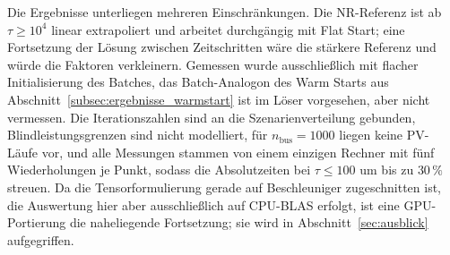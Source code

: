 Die Ergebnisse unterliegen mehreren Einschränkungen. Die NR-Referenz ist ab
$\tau\ge10^4$ linear extrapoliert und arbeitet durchgängig mit Flat Start; eine
Fortsetzung der Lösung zwischen Zeitschritten wäre die stärkere Referenz und
würde die Faktoren verkleinern. Gemessen wurde ausschließlich mit flacher
Initialisierung des Batches, das Batch-Analogon des Warm Starts aus
Abschnitt~\ref{subsec:ergebnisse_warmstart} ist im Löser vorgesehen, aber nicht
vermessen. Die Iterationszahlen sind an die Szenarienverteilung gebunden,
Blindleistungsgrenzen sind nicht modelliert, für $n_\mathrm{bus}=1000$ liegen
keine PV-Läufe vor, und alle Messungen stammen von einem einzigen Rechner mit
fünf Wiederholungen je Punkt, sodass die Absolutzeiten bei $\tau\le100$ um bis
zu $30\,\%$ streuen. Da die Tensorformulierung gerade auf Beschleuniger
zugeschnitten ist, die Auswertung hier aber ausschließlich auf CPU-BLAS
erfolgt, ist eine GPU-Portierung die naheliegende Fortsetzung; sie wird in
Abschnitt~\ref{sec:ausblick} aufgegriffen.


